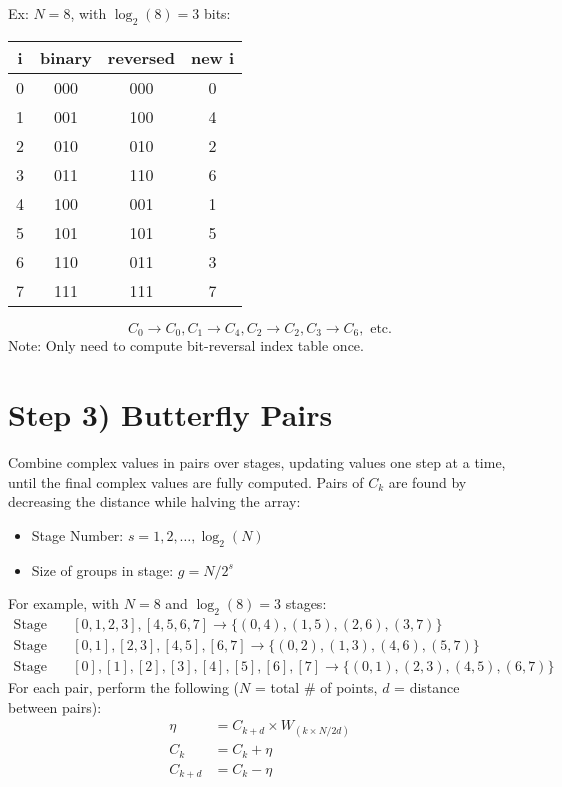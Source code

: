 \documentclass[12pt]{article}
\begin{document}
Ex: $N=8$, with $\log_2(8)=3$ bits:
\begin{center}
\begin{tabular}{|c|c|c|c|}
\hline
i & binary & reversed & new i\\
\hline
0 & 000 & 000 & 0\\
1 & 001 & 100 & 4\\
2 & 010 & 010 & 2\\
3 & 011 & 110 & 6\\
4 & 100 & 001 & 1\\
5 & 101 & 101 & 5\\
6 & 110 & 011 & 3\\
7 & 111 & 111 & 7\\
\hline
\end{tabular}
\end{center}

\[C_0 \to C_0, C_1 \to C_4, C_2 \to C_2, C_3 \to C_6, \text{ etc.}\]
Note: Only need to compute bit-reversal index table once.

\section*{Step 3) Butterfly Pairs}
Combine complex values in pairs over stages, updating values one step at a time, until the final complex values are fully computed. Pairs of $C_k$ are found by decreasing the distance while halving the array:
\begin{itemize}
    \item Stage Number: $s = 1,2,\ldots,\log_2(N)$
    \item Size of groups in stage: $g = N/2^s$
\end{itemize}

$ $\\
For example, with $N=8$ and $\log_2(8)=3$ stages:
\begin{align*}
\text{Stage 1:} & \quad [0,1,2,3],[4,5,6,7] \to \{(0,4),(1,5),(2,6),(3,7)\}\\
\text{Stage 2:} & \quad [0,1],[2,3],[4,5],[6,7] \to \{(0,2),(1,3),(4,6),(5,7)\}\\
\text{Stage 3:} & \quad [0],[1],[2],[3],[4],[5],[6],[7] \to \{(0,1),(2,3),(4,5),(6,7)\}
\end{align*}
$ $\\
For each pair, perform the following ($N$ = total \# of points, $d$ = distance between pairs):
\begin{align*}
\eta &= C_{k+d} \times W_{(k\times N/2d)}\\
C_k &= C_k + \eta\\
C_{k+d} &= C_k - \eta
\end{align*}
\end{document}
